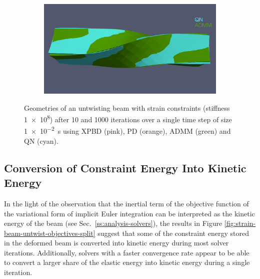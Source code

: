 \begin{figure}[h]
\begin{subfigure}{0.49\textwidth}
    \end{subfigure}
    \hspace{0.001\textwidth}
    \begin{subfigure}{0.49\textwidth}
        \includegraphics[width=\textwidth, trim={0 4.5cm 0 2.15cm}, clip]{figures/strain_beam_untwist_QN_vs_ADMM_10_iterations.png}
    \end{subfigure}
    \caption{Geometries of an untwisting beam with strain constraints (stiffness \num{1e8}) after 10 and 1000 iterations over a single time step of size 
        \SI{1e-2}{\second} using XPBD (pink), PD (orange), ADMM (green) and QN (cyan).}
    \label{fig:strain-beam-untwist-geometries}
\end{figure}

\subsection{Conversion of Constraint Energy Into Kinetic Energy}\label{ss:conversion-constraint-kinetic}
In the light of the observation that the inertial term of the objective function of the variational form of implicit Euler integration can be interpreted as the kinetic 
energy of the beam (see Sec.\ \ref{ss:analysis-solvers}), the results in Figure \ref{fig:strain-beam-untwist-objectives-split} suggest that some of the 
constraint energy stored in the deformed beam is converted into kinetic energy during most solver iterations. Additionally, solvers with a 
faster convergence rate appear to be able to convert a larger share of the elastic energy into kinetic energy during a single iteration. 


